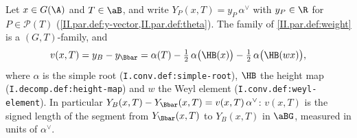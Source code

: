 Let $x\in G(\A)$ and $T\in\aB$, and write $Y_P(x,T)=y_P\,\alpha^\vee$ with $y_P\in\R$ for $P\in\mathcal P(T)$ (\cref{II.par.def:y-vector,II.par.def:theta}). The
family of \cref{II.par.def:weight} is a $(G,T)$-family, and
\[
  v(x,T)=y_B-y_{\Bbar}=\alpha(T)-\tfrac12\,\alpha\bigl(\HB(x)\bigr)-\tfrac12\,\alpha\bigl(\HB(wx)\bigr),
\]
where $\alpha$ is the simple root (\texttt{I.conv.def:simple-root}), $\HB$ the height map (\texttt{I.decomp.def:height-map}) and $w$ the Weyl element
(\texttt{I.conv.def:weyl-element}). In particular $Y_B(x,T)-Y_{\Bbar}(x,T)=v(x,T)\,\alpha^\vee$: $v(x,T)$ is the signed length of the segment from
$Y_{\Bbar}(x,T)$ to $Y_B(x,T)$ in $\aBG$, measured in units of $\alpha^\vee$.

